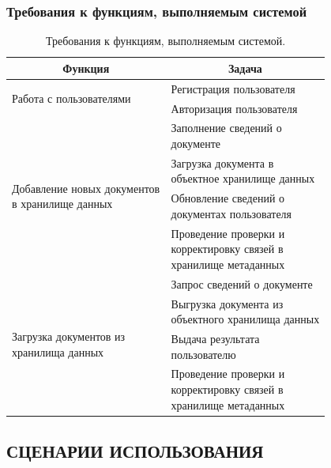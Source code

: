 \documentclass[a4paper,14pt]{extarticle}
\newcommand{\heading}[1]{\multicolumn{1}{|c|}{\textbf{#1}}}
\begin{document}
\newpage
\subsubsection{Требования к функциям, выполняемым системой}
\begin{table}[h!]
	\caption{\label{tab:functions} Требования к функциям, выполняемым системой.}
	\begin{center}\small
		\begin{tabular}{|m{0.4\linewidth}|m{0.4\linewidth}|}
			\hline
			\heading{Функция} & \heading{Задача}\\
			\hline
			
			\multirow{2}{0.95\linewidth}{Работа с пользователями}
			& Регистрация пользователя \\\cline{2-2}
			& Авторизация пользователя \\\hline

			\multirow{4}{0.95\linewidth}{Добавление новых документов в хранилище данных} 
			& Заполнение сведений о документе \\\cline{2-2}
			& Загрузка документа в объектное хранилище данных \\\cline{2-2}
			& Обновление сведений о документах пользователя \\\cline{2-2}
			& Проведение проверки и корректировку связей в хранилище метаданных \\\hline
			
			\multirow{4}{0.95\linewidth}{Загрузка документов из хранилища данных} 
			& Запрос сведений о документе \\\cline{2-2}
			& Выгрузка документа из объектного хранилища данных \\\cline{2-2}
			& Выдача результата пользователю \\\cline{2-2}
			& Проведение проверки и корректировку связей в хранилище метаданных \\\hline
			
			
		\end{tabular}
	\end{center}
\end{table}
\subsection{СЦЕНАРИИ ИСПОЛЬЗОВАНИЯ}
\end{document}
